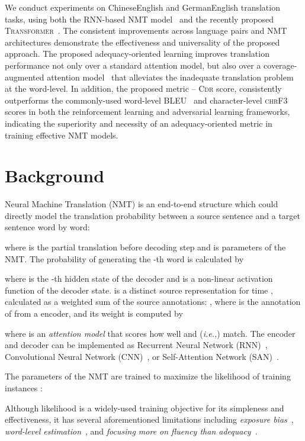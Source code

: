 \documentclass[letterpaper]{article} \usepackage{aaai19}  \usepackage{times}  \usepackage{helvet}  \usepackage{courier}  \usepackage{url}  \usepackage{graphicx}  \frenchspacing  \setlength{\pdfpagewidth}{8.5in}  \setlength{\pdfpageheight}{11in}  \usepackage{amsmath}
\begin{document}
We conduct experiments on ChineseEnglish and GermanEnglish translation tasks, using both the RNN-based NMT model~\cite{bahdanau2014neural} and the recently proposed \textsc{Transformer}~\cite{vaswani2017attention}. The consistent improvements across language pairs and NMT architectures demonstrate the effectiveness and universality of the proposed approach. 
The proposed adequacy-oriented learning improves translation performance not only over a standard attention model, but also over a coverage-augmented attention model~\cite{tu2016modeling} that alleviates the inadequate translation problem at the word-level. In addition, the proposed metric -- \textsc{Cdr} score, consistently outperforms the commonly-used word-level BLEU~\cite{papineni2002bleu} and character-level \textsc{chrF3}~\cite{popovic2015chrf} scores in both the reinforcement learning and adversarial learning frameworks, indicating the superiority and necessity of an adequacy-oriented metric in training effective NMT models.

\section{Background}

Neural Machine Translation (NMT) is an end-to-end structure which could directly model the translation probability between a source sentence  and a target sentence  word by word:

where  is the partial translation before decoding step  and  is parameters of the NMT. The probability of generating the -th word  is calculated by

where  is the -th hidden state of the decoder and  is a non-linear activation function of the decoder state.  is a distinct source representation for time , calculated as a weighted sum of the source annotations: ,
where  is the annotation of  from a encoder, and its weight  is computed by

where  is an \emph{attention model} that scores how well  and  (\emph{i.e.,}\xspace ) match. The encoder and decoder can be implemented as Recurrent Neural Network (RNN)~\cite{bahdanau2014neural}, Convolutional Neural Network (CNN)~\cite{gehring2017convolutional}, or Self-Attention Network (SAN)~\cite{vaswani2017attention}.


The parameters of the NMT  are trained to maximize the likelihood of training instances :

Although likelihood is a widely-used training objective for its simpleness and effectiveness, it has several aforementioned limitations including {\em exposure bias}~\cite{Ranzato:2016:ICLR,Wiseman:2016:EMNLP}, {\em word-level estimation}~\cite{Shen:2016:ACL}, and {\em focusing more on fluency than adequacy}~\cite{Tu:2017:AAAI}.
\end{document}
